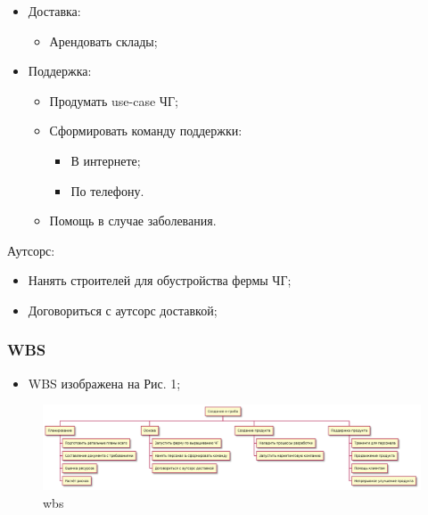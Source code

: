 \documentclass[a4paper,10pt]{article}
\begin{document}
\begin{itemize}
\begin{itemize}
            \end{itemize}
        \item Доставка:
            \begin{itemize}
                \item Арендовать склады;
            \end{itemize}
        \item Поддержка:
            \begin{itemize}
                \item Продумать use-case ЧГ;
                \item Сформировать команду поддержки:
                    \begin{itemize}
                        \item В интернете;
                        \item По телефону.
                    \end{itemize}
                \item Помощь в случае заболевания.
            \end{itemize}
    \end{itemize}

Аутсорс:

    \begin{itemize}
        \item Нанять строителей для обустройства фермы ЧГ;
        \item Договориться с аутсорс доставкой;
    \end{itemize}

\subsubsection{WBS}

    \begin{itemize}
        \item WBS изображена на Рис. 1;
    \end{itemize}

    \begin{figure}[h]
        \centering
        \includegraphics[width=1\textwidth]{./pics/wbs.pdf}
        \caption{wbs}
    \end{figure}
\end{document}
